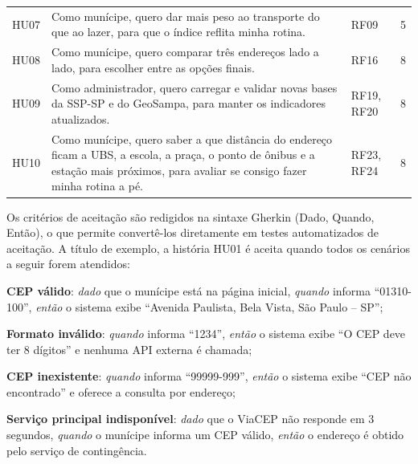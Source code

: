 \begin{longtable}{C{1.2cm}L{9.0cm}C{2.1cm}C{1.3cm}}
	HU07        & Como munícipe, quero dar mais peso ao transporte do que ao lazer, para que o índice reflita minha rotina.                                                                            & RF09                & 5               \\
	HU08        & Como munícipe, quero comparar três endereços lado a lado, para escolher entre as opções finais.                                                                                      & RF16                & 8               \\
	HU09        & Como administrador, quero carregar e validar novas bases da SSP-SP e do GeoSampa, para manter os indicadores atualizados.                                                            & RF19, RF20          & 8               \\
	HU10        & Como munícipe, quero saber a que distância do endereço ficam a UBS, a escola, a praça, o ponto de ônibus e a estação mais próximos, para avaliar se consigo fazer minha rotina a pé. & RF23, RF24          & 8               \\
\end{longtable}
\vspace{-0.4cm}

Os critérios de aceitação são redigidos na sintaxe Gherkin (Dado, Quando, Então), o que permite convertê-los diretamente em testes automatizados de aceitação. A título de exemplo, a história HU01 é aceita quando todos os cenários a seguir forem atendidos:

\begin{alineas}
	\item \textbf{CEP válido}: \emph{dado} que o munícipe está na página inicial, \emph{quando} informa ``01310-100'', \emph{então} o sistema exibe ``Avenida Paulista, Bela Vista, São Paulo -- SP'';
	\item \textbf{Formato inválido}: \emph{quando} informa ``1234'', \emph{então} o sistema exibe ``O CEP deve ter 8 dígitos'' e nenhuma API externa é chamada;
	\item \textbf{CEP inexistente}: \emph{quando} informa ``99999-999'', \emph{então} o sistema exibe ``CEP não encontrado'' e oferece a consulta por endereço;
	\item \textbf{Serviço principal indisponível}: \emph{dado} que o ViaCEP não responde em 3 segundos, \emph{quando} o munícipe informa um CEP válido, \emph{então} o endereço é obtido pelo serviço de contingência.
\end{alineas}

